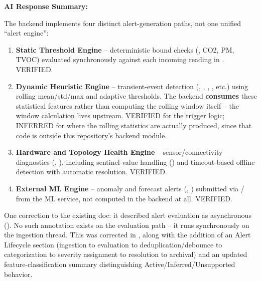 \documentclass[conference]{IEEEtran}
\begin{document}
\noindent\textbf{AI Response Summary:}\par

The backend implements four distinct alert-generation paths, not one unified ``alert engine'':

\begin{enumerate}
\setlength{\itemsep}{2pt}
\item \textbf{Static Threshold Engine} -- deterministic bound checks (\texttt{}, CO2, PM, TVOC) evaluated synchronously against each incoming reading in \texttt{}. VERIFIED.
\item \textbf{Dynamic Heuristic Engine} -- transient-event detection (\texttt{}, \texttt{}, \texttt{}, \texttt{}, etc.) using rolling mean/std/max and adaptive thresholds. The backend \textbf{consumes} these statistical features rather than computing the rolling window itself -- the window calculation lives upstream. VERIFIED for the trigger logic; INFERRED for where the rolling statistics are actually produced, since that code is outside this repository's backend module.
\item \textbf{Hardware and Topology Health Engine} -- sensor/connectivity diagnostics (\texttt{}, \texttt{}), including sentinel-value handling (\texttt{}) and timeout-based offline detection with automatic resolution. VERIFIED.
\item \textbf{External ML Engine} -- anomaly and forecast alerts (\texttt{}, \texttt{}) submitted via \texttt{}/\texttt{} from the ML service, not computed in the backend at all. VERIFIED.
\end{enumerate}

One correction to the existing doc: it described alert evaluation as asynchronous (\texttt{}). No such annotation exists on the evaluation path -- it runs synchronously on the ingestion thread. This was corrected in \texttt{}, along with the addition of an Alert Lifecycle section (ingestion to evaluation to deduplication/debounce to categorization to severity assignment to resolution to archival) and an updated feature-classification summary distinguishing Active/Inferred/Unsupported behavior.
\end{document}
